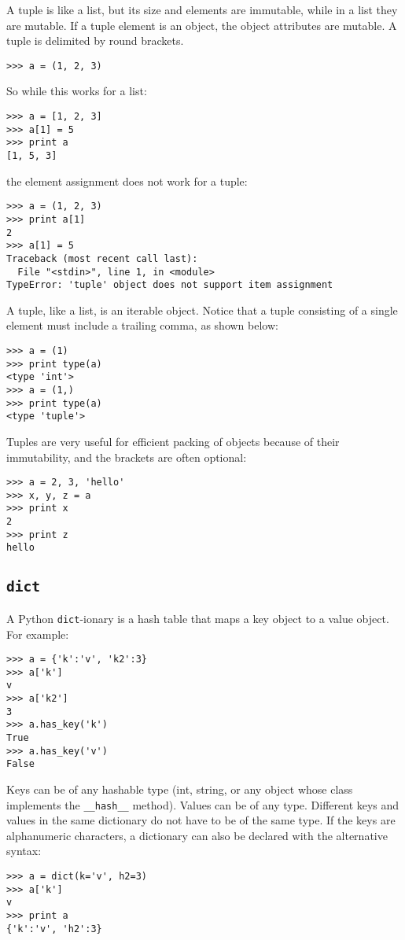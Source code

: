 \documentclass[justified,sixbynine,notoc]{tufte-book}
\def\ft{\small\tt}
\def\inxx#1{\index{#1}}
\begin{document}
\begin{fullwidth}
A tuple is like a list, but its size and elements are immutable, while in a list they are mutable. If a tuple element is an object, the object attributes are mutable. A tuple is delimited by round brackets.
\begin{lstlisting}
>>> a = (1, 2, 3)
\end{lstlisting}

So while this works for a list:
\begin{lstlisting}
>>> a = [1, 2, 3]
>>> a[1] = 5
>>> print a
[1, 5, 3]
\end{lstlisting}
\noindent the element assignment does not work for a tuple:
\begin{lstlisting}
>>> a = (1, 2, 3)
>>> print a[1]
2
>>> a[1] = 5
Traceback (most recent call last):
  File "<stdin>", line 1, in <module>
TypeError: 'tuple' object does not support item assignment
\end{lstlisting}

A tuple, like a list, is an iterable object. Notice that a tuple consisting of a single element must include a trailing comma, as shown below:
\begin{lstlisting}
>>> a = (1)
>>> print type(a)
<type 'int'>
>>> a = (1,)
>>> print type(a)
<type 'tuple'>
\end{lstlisting}

Tuples are very useful for efficient packing of objects because of their immutability, and the brackets are often optional:
\begin{lstlisting}
>>> a = 2, 3, 'hello'
>>> x, y, z = a
>>> print x
2
>>> print z
hello
\end{lstlisting}

\goodbreak\subsection{{\ft dict}}

\inxx{dict}

A Python {\ft dict}-ionary is a hash table that maps a key object to a value object. For example:
\begin{lstlisting}
>>> a = {'k':'v', 'k2':3}
>>> a['k']
v
>>> a['k2']
3
>>> a.has_key('k')
True
>>> a.has_key('v')
False
\end{lstlisting}

Keys can be of any hashable type (int, string, or any object whose class implements the {\ft \_\_hash\_\_} method). Values can be of any type. Different keys and values in the same dictionary do not have to be of the same type. If the keys are alphanumeric characters, a dictionary can also be declared with the alternative syntax:
\begin{lstlisting}
>>> a = dict(k='v', h2=3)
>>> a['k']
v
>>> print a
{'k':'v', 'h2':3}
\end{lstlisting}


\end{fullwidth}
\end{document}
